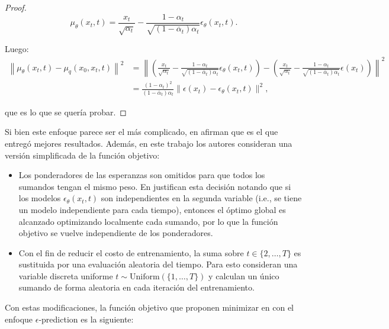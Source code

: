 \begin{proof}
    \begin{equation*}
        \mu_\theta(x_t,t) = \frac{x_t}{\sqrt{\alpha_t}} - \frac{1-\alpha_t}{\sqrt{(1-\overline{\alpha}_t)\alpha_t}}\epsilon_\theta(x_t,t).
    \end{equation*}

    Luego:
    \begin{align*}
        \left\| \mu_\theta(x_t,t) - \mu_q(x_0,x_t,t) \right\|^2 & = \left\| \left(\frac{x_t}{\sqrt{\alpha_t}} - \frac{1-\alpha_t}{\sqrt{(1-\overline{\alpha}_t)\alpha_t}}\epsilon_\theta(x_t,t)\right) - \left(\frac{x_t}{\sqrt{\alpha_t}} - \frac{1-\alpha_t}{\sqrt{(1-\overline{\alpha}_t)\alpha_t}}\epsilon(x_t)\right) \right\|^2 \\
                                                                & = \frac{(1-\alpha_t)^2}{(1-\bar\alpha_t)\alpha_t} \| \epsilon(x_t) - \epsilon_\theta(x_t,t) \|^2 ,
    \end{align*}

    que es lo que se quería probar.
\end{proof}

Si bien este enfoque parece ser el más complicado, en \cite{ho2020denoising} afirman que es el que entregó mejores resultados. Además, en este trabajo los autores consideran una versión simplificada de la función objetivo:

\begin{itemize}
    \item Los ponderadores de las esperanzas son omitidos para que todos los sumandos tengan el mismo peso. En \cite{song2022denoising} justifican esta decisión notando que si los modelos $\epsilon_\theta(x_t,t)$ son independientes en la segunda variable (i.e., se tiene un modelo independiente para cada tiempo), entonces el óptimo global es alcanzado optimizando localmente cada sumando, por lo que la función objetivo se vuelve independiente de los ponderadores.
    \item Con el fin de reducir el costo de entrenamiento, la suma sobre $t\in\{2,\ldots,T\}$ es sustituida por una evaluación aleatoria del tiempo. Para esto consideran una variable discreta uniforme $t\sim\text{Uniform}\left(\{1,\ldots,T\}\right)$ y calculan un único sumando de forma aleatoria en cada iteración del entrenamiento.
\end{itemize}

Con estas modificaciones, la función objetivo que proponen minimizar en \cite{ho2020denoising} con el enfoque $\epsilon$-prediction es la siguiente:

